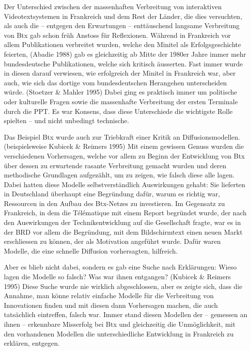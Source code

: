 \documentclass[a4paper,
fontsize=11pt,
oneside,
numbers=noperiodatend,
parskip=half-,
bibliography=totoc,
final
]{scrartcl}
\begin{document}
Der Unterschied zwischen der massenhaften Verbreitung von interaktiven
Videotextsystemen in Frankreich und dem Rest der Länder, die dies
versuchten, als auch die -- entgegen den Erwartungen -- enttäuschend
langsame Verbreitung von Btx gab schon früh Anstoss für Reflexionen.
Während in Frankreich vor allem Publikationen verbreitet wurden, welche
den Minitel als Erfolgsgeschichte feierten, (Abadie 1988) gab es
gleichzeitig ab Mitte der 1980er Jahre immer mehr bundesdeutsche
Publikationen, welche sich kritisch äusserten. Fast immer wurde in
diesen darauf verwiesen, wie erfolgreich der Minitel in Frankreich war,
aber auch, wie sich das dortige vom bundesdeutschen Herangehen
unterscheiden würde. (Stoetzer \& Mahler 1995) Dabei ging es praktisch
immer um politische oder kulturelle Fragen sowie die massenhafte
Verbreitung der ersten Terminale durch die PPT. Es war Konsens, dass
diese Unterschiede die wichtigste Rolle spielten -- und nicht unbedingt
technische.

Das Beispiel Btx wurde auch zur Triebkraft einer Kritik an
Diffusionsmodellen. (beispielsweise Kubicek \& Reimers 1995) Mit einem
gewissen Genuss wurden die verschiedenen Vorhersagen, welche vor allem
zu Beginn der Entwicklung von Btx über dessen zu erwartende rasante
Verbreitung gemacht wurden und deren methodische Grundlagen aufgezählt,
um zu zeigen, wie falsch diese alle lagen. Dabei hatten diese Modelle
selbstverständlich Auswirkungen gehabt: Sie lieferten in Deutschland
überhaupt eine Begründung dafür, warum es richtig war, Ressourcen in den
Aufbau des Btx-Netzes zu investieren. Im Gegensatz zu Frankreich, in dem
die Télématique mit einem Report begründet wurde, der nach den
Auswirkungen der Technikentwicklung auf die Gesellschaft fragte, war es
in der BRD vor allem die Begründung, mit dem Bildschirmtext einen neuen
Markt erschliessen zu können, der als Motivation angeführt wurde. Dafür
waren Modelle, die eine schnelle Diffusion vorhersagten, hilfreich.

Aber es blieb nicht dabei, sondern es gab eine Suche nach Erklärungen:
Wieso lagen die Modelle so falsch? Was war ihnen entgangen? (Kubicek \&
Reimers 1995) Diese Suche wurde nie wirklich abgeschlossen, aber es
zeigte sich, dass die Annahme, man könne relativ einfache Modelle für
die Verbreitung von Innovationen finden und mit diesen dann Vorhersagen
machen, die auch tatsächlich eintreffen, falsch war. Immer stand diesen
Modellen der -- gemessen an ihnen -- erkennbare Misserfolg bei Btx und
gleichzeitig die Unmöglichkeit, mit den vorhandenen Modellen die
unterschiedliche Entwicklung in Frankreich zu erklären, entgegen.
\end{document}

